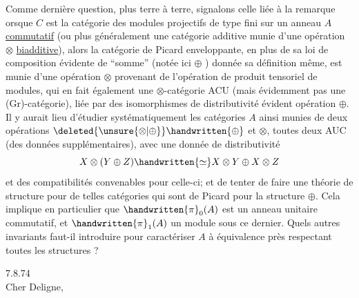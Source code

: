 Comme dernière question, plus terre à terre, signalons celle liée à la remarque   orsque  $C$ est la catégorie des modules projectifs de type fini sur un anneau $A$ \uline{commutatif} (ou plus généralement une catégorie additive munie d'une opération $\otimes$   \uline{biadditive}), alors la catégorie de Picard enveloppante, en plus de sa loi de composition évidente de ``somme'' (notée ici $\oplus$ ) donnée   sa définition même, est munie d'une opération $\otimes$ provenant de l'opération de produit tensoriel  de modules, qui en fait également une $\otimes$-catégorie ACU (mais évidemment pas une (Gr)-catégorie), liée par des isomorphismes de distributivité évident   opération $\oplus$. Il y aurait lieu d'étudier systématiquement les catégories $A$ ainsi munies de deux opérations $\deleted{\unsure{\otimes|\oplus}}\handwritten{\oplus}$ et $\otimes$, toutes deux AUC (des données supplémentaires), avec une donnée de distributivité
\[
X\otimes(Y\oplus Z)\handwritten{\simeq}X\otimes Y\oplus X\otimes Z
\]
et des compatibilités convenables pour celle-ci; et de tenter de faire une théorie de structure pour de telles catégories qui sont de  Picard pour la structure $\oplus$. Cela implique en particulier que $\handwritten{\pi}_{0}(A)$ est un anneau unitaire commutatif, et $\handwritten{\pi}_{1}(A)$ un module sous ce dernier. Quels autres invariants faut-il introduire pour caractériser $A$ à équivalence près respectant toutes les structures ?


  7.8.74\\
Cher Deligne,\\

